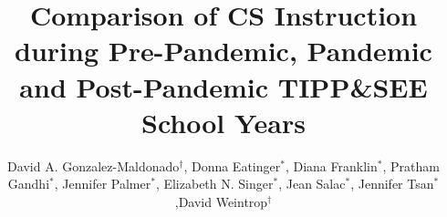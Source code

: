 \documentclass[sigconf,manuscript,review,anonymous]{acmart} %
\def\ts{TIPP\&SEE}
\begin{document}
\title[]{Comparison of CS Instruction during Pre-Pandemic, Pandemic and Post-Pandemic \ts{} School Years}

\author{David A. Gonzalez-Maldonado$^\dagger$, Donna Eatinger$^\ast$, Diana Franklin$^\ast$, Pratham Gandhi$^\ast$, Jennifer Palmer$^\ast$, Elizabeth N. Singer$^\ast$, Jean Salac$^\ast$, Jennifer Tsan$^\ast$,David Weintrop$^\dagger$}

\end{document}
